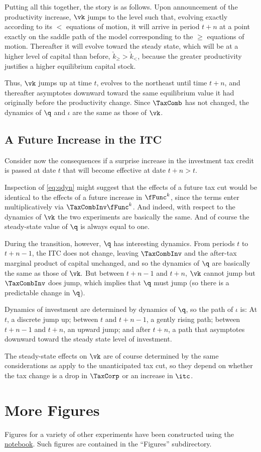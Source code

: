 \documentclass[headings=optiontotocandhead,toc=flat]{handout}
\begin{document}
Putting all this together, the story is as follows.  Upon announcement
of the productivity increase, $\vk$ jumps to the level such that,
evolving exactly according to its ${<}$ equations of motion, it will
arrive in period $t+n$ at a point exactly on the saddle path of the
model corresponding to the ${\geq}$ equations of motion.  Thereafter
it will evolve toward the steady state, which will be at a higher
level of capital than before, $\check{k}_{\geq} > \check{k}_{<}$, because
the greater productivity justifies a higher equilibrium capital stock.

Thus, $\vk$ jumps up at time $t$, evolves to the northeast until
time $t+n$, and thereafter asymptotes downward toward the same equilibrium
value it had originally before the productivity change.  Since
$\TaxComb$ has not changed, the dynamics of $\q$ and $\iota$ are the
same as those of $\vk$.

\subsection[hypertarget={Future-Increase-In-ITC}]{A Future Increase in the ITC}

Consider now the consequences if a surprise increase in the investment tax credit is passed at date $t$ that will become effective at date $t+n>t$.

Inspection of \eqref{eq:qdyn} might suggest that the effects of a future tax cut would be identical to the effects of a future increase in $\fFunc^{k}$, since the terms enter multiplicatively via $\TaxCombInv \fFunc^{k}$.  And indeed, with respect to the dynamics of $\vk$ the two experiments are basically the same.  And of course the steady-state value of $\q$ is always equal to one.

During the transition, however, $\q$ has interesting dynamics.  From periods $t$ to $t+n-1$, the ITC does not change, leaving $\TaxCombInv$ and the after-tax marginal product of capital unchanged, and so the dynamics of $\q$ are basically the same as those of $\vk.$ But between $t+n-1$ and $t+n$, $\vk$ cannot jump but $\TaxCombInv$ does jump, which implies that $\q$ must jump (so there is a predictable change in $\q$).

Dynamics of investment are determined by dynamics of $\q$, so the path of $\iota$ is: At $t$, a discrete jump up; between $t$ and $t+n-1$, a gently rising path; between $t+n-1$ and $t+n$, an upward jump; and after $t+n$, a path that asymptotes downward toward the steady state level of investment.

The steady-state effects on $\vk$ are of course determined by the same considerations as apply to the unanticipated tax cut, so they depend on whether the tax change is a drop in $\TaxCorp$ or an increase in $\itc$.

\section{More Figures}

Figures for a variety of other experiments have been constructed using the 
\href{\darkolo/\notebook}{notebook}.  Such figures are contained in the ``Figures'' subdirectory.

\pagebreak

\end{document}
